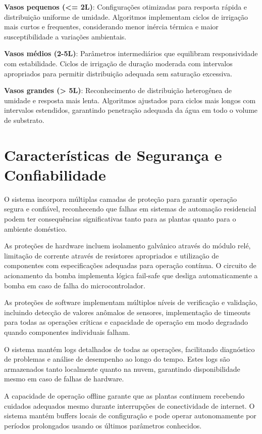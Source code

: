 \documentclass[twoside,english,brazilian]{UNISINOSmonografia}
\begin{document}
\textbf{Vasos pequenos (<= 2L)}: Configurações otimizadas para resposta rápida e distribuição uniforme de umidade. Algoritmos implementam ciclos de irrigação mais curtos e frequentes, considerando menor inércia térmica e maior susceptibilidade a variações ambientais.

\textbf{Vasos médios (2-5L)}: Parâmetros intermediários que equilibram responsividade com estabilidade. Ciclos de irrigação de duração moderada com intervalos apropriados para permitir distribuição adequada sem saturação excessiva.

\textbf{Vasos grandes (> 5L)}: Reconhecimento de distribuição heterogênea de umidade e resposta mais lenta. Algoritmos ajustados para ciclos mais longos com intervalos estendidos, garantindo penetração adequada da água em todo o volume de substrato.

\section{Características de Segurança e Confiabilidade}

O sistema incorpora múltiplas camadas de proteção para garantir operação segura e confiável, reconhecendo que falhas em sistemas de automação residencial podem ter consequências significativas tanto para as plantas quanto para o ambiente doméstico.

As proteções de hardware incluem isolamento galvânico através do módulo relé, limitação de corrente através de resistores apropriados e utilização de componentes com especificações adequadas para operação contínua. O circuito de acionamento da bomba implementa lógica fail-safe que desliga automaticamente a bomba em caso de falha do microcontrolador.

As proteções de software implementam múltiplos níveis de verificação e validação, incluindo detecção de valores anômalos de sensores, implementação de timeouts para todas as operações críticas e capacidade de operação em modo degradado quando componentes individuais falham.

O sistema mantém logs detalhados de todas as operações, facilitando diagnóstico de problemas e análise de desempenho ao longo do tempo. Estes logs são armazenados tanto localmente quanto na nuvem, garantindo disponibilidade mesmo em caso de falhas de hardware.

A capacidade de operação offline garante que as plantas continuem recebendo cuidados adequados mesmo durante interrupções de conectividade de internet. O sistema mantém buffers locais de configuração e pode operar autonomamente por períodos prolongados usando os últimos parâmetros conhecidos.
\end{document}
